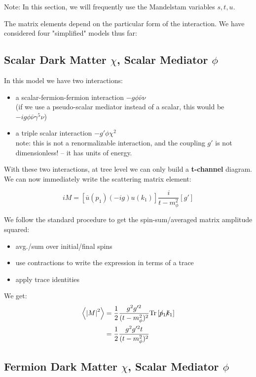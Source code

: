\documentclass[11pt, oneside]{article}   	%
\newcommand{\fsl}[1]{\ensuremath{\mathrlap{\!\not{\phantom{#1}}}#1}}%
\begin{document}
Note: In this section, we will frequently use the Mandelstam variables $s, t, u$.

The matrix elements depend on the particular form of the interaction. We have considered four "simplified" models thus far: 

\subsection{\normalsize Scalar Dark Matter $\chi$, Scalar Mediator $\phi$ } 

In this model we have two interactions: 
\begin{itemize}
    \item a scalar-fermion-fermion interaction $-g\phi \bar{\nu} \nu$ \\ (if we use a pseudo-scalar mediator instead of a scalar, this would be $-ig\phi \bar{\nu} \gamma^5 \nu$) 
    \item a triple scalar interaction $-g'\phi \chi^2$ \\ note: this is not a renormalizable interaction, and the coupling $g'$ is not dimensionless! -- it has units of energy.
\end{itemize}

With these two interactions, at tree level we can only build a \textbf{t-channel} diagram.
We can now immediately write the scattering matrix element: 

\[ iM = \left[ \bar{u}(p_1) (-i g) u(k_1) \right] \frac{i}{t-m_\phi^2} \left[ g' \right] \]  

We follow the standard procedure to get the spin-sum/averaged matrix amplitude squared: 
\begin{itemize}
    \item avg./sum over initial/final spins
    \item use contractions to write the expression in terms of a trace
    \item apply trace identities
\end{itemize}
We get: 
\begin{align*}
    \left\langle \left| M \right|^2 \right\rangle &= \frac{1}{2} \frac{g^2g'^2}{(t-m_\phi^2)^2} \text{Tr}\left[ \fsl{p_1} \fsl{k_1} \right] \\ 
    & = \frac{1}{2} \frac{g^2g'^2t}{(t-m_\phi^2)^2}
\end{align*}

\newpage
\subsection{\normalsize Fermion Dark Matter $\chi$, Scalar Mediator $\phi$ } 
\end{document}
